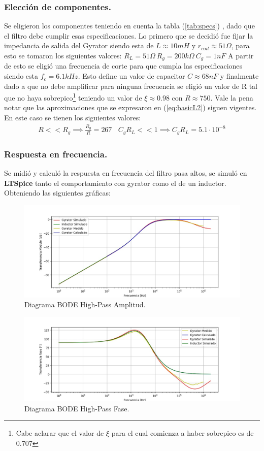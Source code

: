 \subsubsection{Elección de componentes.}
Se eligieron los componentes teniendo en cuenta la tabla (\ref{tab:specs}) , dado que el filtro debe cumplir esas especificaciones.
Lo primero que se decidió fue fijar la impedancia de salida del Gyrator siendo esta de $L \approx 10mH $ y $r_{coil} \approx 51\Omega $, para esto se tomaron los siguientes valores: $R_L = 51\Omega \ R_g = 200k\Omega \ C_g = 1nF$
A partir de esto se eligió una frecuencia de corte para que cumpla las especificaciones siendo esta $f_c =6.1kHz $. Esto define un valor de capacitor $C \approx 68nF$ y finalmente dado a que no debe amplificar para ninguna frecuencia se eligió un valor de R tal que no haya sobrepico\footnote{Cabe aclarar que el valor de $\xi$ para el cual comienza a haber sobrepico es de 0.707} teniendo un valor de $\xi \approx 0.98 $ con $R \approx 750 $.
	Vale la pena notar que las aproximaciones que se expresaron en (\ref{eq:basicL2}) siguen vigentes. En este caso se tienen los siguientes valores:
\begin{align}  R<<R_g \implies  \frac{R_g}{R}=  267 \ \ \ \ C_gR_L << 1 \implies C_gR_L=5.1 \cdot 10^{-8} \end{align}

\subsubsection{Respuesta en frecuencia.}
Se midió y calculó la respuesta en frecuencia del filtro pasa altos, se simuló en \textbf{LTSpice}  tanto el comportamiento con gyrator como el de un inductor. Obteniendo las siguientes gráficas:
\begin{figure}[H]	
	\centering
	\includegraphics[width=\textwidth]{ImagenesEj2/bodehp.jpg}
	\caption{Diagrama BODE High-Pass Amplitud.}
	\label{fig:bodehp}
\end{figure}
\begin{figure}[H]	
	\centering
	\includegraphics[width=\textwidth]{ImagenesEj2/bodehpp.jpg}
	\caption{Diagrama BODE High-Pass Fase.}
	\label{fig:bodehpp}
\end{figure}
